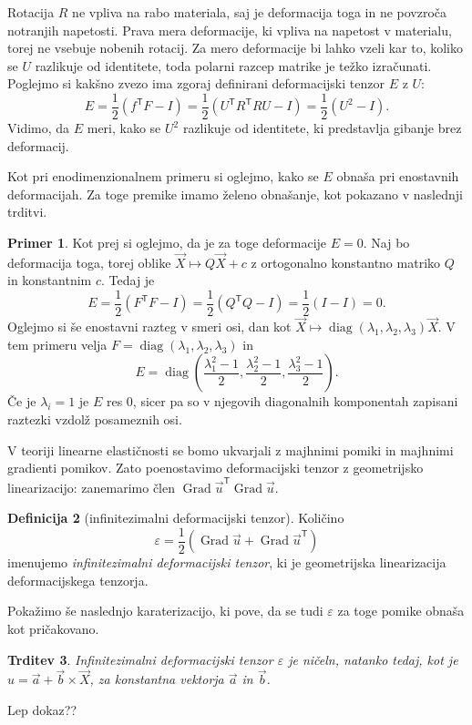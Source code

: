\documentclass[a4paper,twoside]{article}
\theoremstyle{definition} %
\newtheorem{definicija}{Definicija}[section]
\newtheorem{primer}[definicija]{Primer}
\theoremstyle{plain} %
\newtheorem{trditev}[definicija]{Trditev}
\numberwithin{equation}{section}
\newcommand{\T}{\mathsf{T}}
\newcommand{\Grad}{\operatorname{Grad}}
\newcommand{\eps}{\varepsilon}
\newcommand{\vv}{\vec{v}}
\newcommand{\vu}{\vec{u}}
\newcommand{\va}{\vec{a}}
\newcommand{\vb}{\vec{b}}
\newcommand{\vX}{\vec{X}}
\DeclareMathOperator{\diag}{diag}
\begin{document}
Rotacija $R$ ne vpliva na rabo materiala, saj je deformacija toga in ne povzroča
notranjih napetosti. Prava mera deformacije, ki vpliva na napetost v materialu,
torej ne vsebuje nobenih rotacij. Za mero deformacije bi lahko vzeli kar to,
koliko se $U$ razlikuje od identitete, toda polarni razcep matrike je težko
izračunati. Poglejmo si kakšno zvezo ima zgoraj definirani deformacijski tenzor
$E$ z $U$:
\[
  E = \frac12(f^\T F - I) = \frac12(U^\T R^\T R U - I) = \frac12 (U^2 - I).
\]
Vidimo, da $E$ meri, kako se $U^2$ razlikuje od identitete, ki predstavlja
gibanje brez deformacij.

Kot pri enodimenzionalnem primeru si oglejmo, kako se $E$ obnaša pri enostavnih
deformacijah. Za toge premike imamo želeno obnašanje, kot pokazano v naslednji
trditvi.

\begin{primer}
  Kot prej si oglejmo, da je za toge deformacije $E = 0$.
 Naj bo deformacija toga, torej oblike $\vX \mapsto Q\vX +
c$ z ortogonalno konstantno matriko $Q$ in konstantnim $c$. Tedaj je
\[ E = \frac12 (F^\T F - I) = \frac12(Q^\T Q - I) = \frac12(I - I) = 0. \]
Oglejmo si še enostavni razteg v smeri osi, dan kot
$\vX \mapsto \diag(\lambda_1, \lambda_2, \lambda_3) \vX$.
V tem primeru velja $F = \diag(\lambda_1, \lambda_2, \lambda_3)$ in
  \[
    E = \diag\left(
      \frac{\lambda_1^2-1}{2},
      \frac{\lambda_2^2-1}{2},
      \frac{\lambda_3^2-1}{2}
    \right).
  \]
  Če je $\lambda_i = 1$ je $E$ res 0, sicer pa so v njegovih diagonalnih
  komponentah zapisani raztezki vzdolž posameznih osi.
\end{primer}

V teoriji linearne elastičnosti se bomo ukvarjali z majhnimi pomiki in majhnimi
gradienti pomikov. Zato poenostavimo deformacijski tenzor z geometrijsko
linearizacijo: zanemarimo člen $\Grad \vu^\T \Grad \vu$.

\begin{definicija}[infinitezimalni deformacijski tenzor]
  Količino
  \begin{equation}
    \eps = \frac{1}{2}(\Grad \vu + \Grad \vu^\T)
    \label{eq:eps}
  \end{equation}
  imenujemo \emph{infinitezimalni deformacijski tenzor}, ki je geometrijska
  linearizacija deformacijskega tenzorja.
\end{definicija}

Pokažimo še naslednjo karaterizacijo, ki pove, da se tudi $\eps$ za toge pomike
obnaša kot pričakovano.
\begin{trditev}
  \label{trd:eps-0}
  Infinitezimalni deformacijski tenzor $\eps$ je ničeln, natanko tedaj, kot je
  $u = \va + \vb \times \vX$, za konstantna vektorja $\va$ in $\vb$.
\end{trditev}
\proof
Lep dokaz??
\endproof
\end{document}
